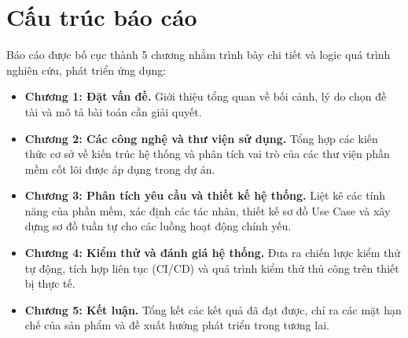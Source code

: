 \section{Cấu trúc báo cáo}
Báo cáo được bố cục thành 5 chương nhằm trình bày chi tiết và logic quá trình nghiên cứu, phát triển ứng dụng:
\begin{itemize}
    \item \textbf{Chương 1: Đặt vấn đề.} Giới thiệu tổng quan về bối cảnh, lý do chọn đề tài và mô tả bài toán cần giải quyết.
    \item \textbf{Chương 2: Các công nghệ và thư viện sử dụng.} Tổng hợp các kiến thức cơ sở về kiến trúc hệ thống và phân tích vai trò của các thư viện phần mềm cốt lõi được áp dụng trong dự án.
    \item \textbf{Chương 3: Phân tích yêu cầu và thiết kế hệ thống.} Liệt kê các tính năng của phần mềm, xác định các tác nhân, thiết kế sơ đồ Use Case và xây dựng sơ đồ tuần tự cho các luồng hoạt động chính yếu.
    \item \textbf{Chương 4: Kiểm thử và đánh giá hệ thống.} Đưa ra chiến lược kiểm thử tự động, tích hợp liên tục (CI/CD) và quá trình kiểm thử thủ công trên thiết bị thực tế.
    \item \textbf{Chương 5: Kết luận.} Tổng kết các kết quả đã đạt được, chỉ ra các mặt hạn chế của sản phẩm và đề xuất hướng phát triển trong tương lai.
\end{itemize}
